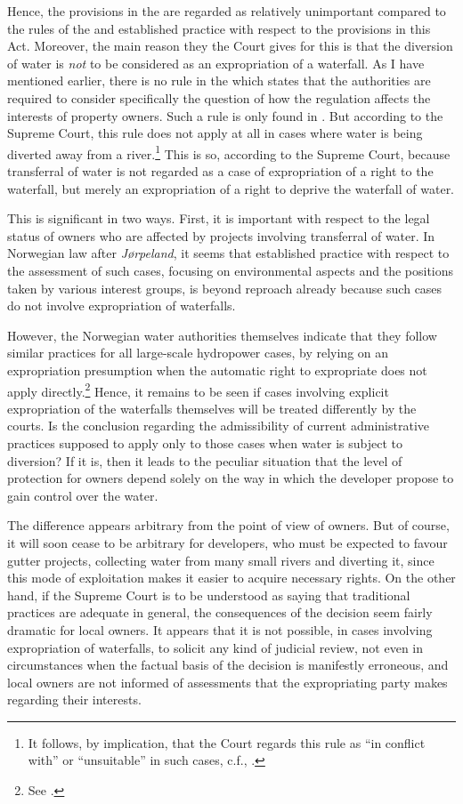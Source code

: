 Hence, the provisions in the \cite{ea59} are regarded as relatively unimportant compared to the rules of the \cite{wra17} and established practice with respect to the provisions in this Act. Moreover, the main reason they the Court gives for this is that the diversion of water is \emph{not} to be considered as an expropriation of a waterfall. As I have mentioned earlier, there is no rule in the \cite{wra17} which states that the authorities are required to consider specifically the question of how the regulation affects the interests of property owners. Such a rule is only found in \cite[2]{ea59}. But according to the Supreme Court, this rule does not apply at all in cases where water is being diverted away from a river.\footnote{It follows, by implication, that the Court regards this rule as ``in conflict with'' or ``unsuitable'' in such cases, c.f., \cite[31]{ea59}.} This is so, according to the Supreme Court, because transferral of water is not regarded as a case of expropriation of a right to the waterfall, but merely an expropriation of a right to deprive the waterfall of water.

This is significant in two ways. First, it is important with respect to the legal status of owners who are affected by projects involving transferral of water. In Norwegian law after {\it Jørpeland}, it seems that established practice with respect to the assessment of such cases, focusing on environmental aspects and the positions taken by various interest groups, is beyond reproach already because such cases do not involve expropriation of waterfalls. 

However, the Norwegian water authorities themselves indicate that they follow similar practices for all large-scale hydropower cases, by relying on an expropriation presumption when the automatic right to expropriate does not apply directly.\footnote{See \cite{flatby08}.} Hence, it remains to be seen if cases involving explicit expropriation of the waterfalls themselves will be treated differently by the courts. Is the conclusion regarding the admissibility of current administrative practices supposed to apply only to those cases when water is subject to diversion? If it is, then it leads to the peculiar situation that the level of protection for owners depend solely on the way in which the developer propose to gain control over the water.

The difference appears arbitrary from the point of view of owners. But of course, it will soon cease to be arbitrary for developers, who must be expected to favour gutter projects, collecting water from many small rivers and diverting it, since this mode of exploitation makes it easier to acquire necessary rights. On the other hand, if the Supreme Court is to be understood as saying that traditional practices are adequate in general, the consequences of the decision seem fairly dramatic for local owners. It appears that it is not possible, in cases involving expropriation of waterfalls, to solicit any kind of judicial review, not even in circumstances when the factual basis of the decision is manifestly erroneous, and local owners are not informed of assessments that the expropriating party makes regarding their interests.

